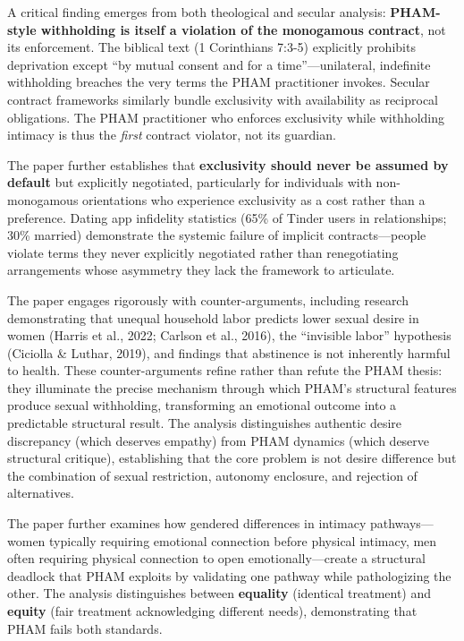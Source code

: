 \documentclass[12pt,openany]{book}
\numberwithin{equation}{chapter}
\begin{document}
A critical finding emerges from both theological and secular analysis: \textbf{PHAM-style withholding is itself a violation of the monogamous contract}, not its enforcement. The biblical text (1 Corinthians 7:3-5) explicitly prohibits deprivation except ``by mutual consent and for a time''---unilateral, indefinite withholding breaches the very terms the PHAM practitioner invokes. Secular contract frameworks similarly bundle exclusivity with availability as reciprocal obligations. The PHAM practitioner who enforces exclusivity while withholding intimacy is thus the \textit{first} contract violator, not its guardian.

The paper further establishes that \textbf{exclusivity should never be assumed by default} but explicitly negotiated, particularly for individuals with non-monogamous orientations who experience exclusivity as a cost rather than a preference. Dating app infidelity statistics (65\% of Tinder users in relationships; 30\% married) demonstrate the systemic failure of implicit contracts---people violate terms they never explicitly negotiated rather than renegotiating arrangements whose asymmetry they lack the framework to articulate.

The paper engages rigorously with counter-arguments, including research demonstrating that unequal household labor predicts lower sexual desire in women (Harris et al., 2022; Carlson et al., 2016), the ``invisible labor'' hypothesis (Ciciolla \& Luthar, 2019), and findings that abstinence is not inherently harmful to health. These counter-arguments refine rather than refute the PHAM thesis: they illuminate the precise mechanism through which PHAM's structural features produce sexual withholding, transforming an emotional outcome into a predictable structural result. The analysis distinguishes authentic desire discrepancy (which deserves empathy) from PHAM dynamics (which deserve structural critique), establishing that the core problem is not desire difference but the combination of sexual restriction, autonomy enclosure, and rejection of alternatives.

The paper further examines how gendered differences in intimacy pathways---women typically requiring emotional connection before physical intimacy, men often requiring physical connection to open emotionally---create a structural deadlock that PHAM exploits by validating one pathway while pathologizing the other. The analysis distinguishes between \textbf{equality} (identical treatment) and \textbf{equity} (fair treatment acknowledging different needs), demonstrating that PHAM fails both standards.
\end{document}

